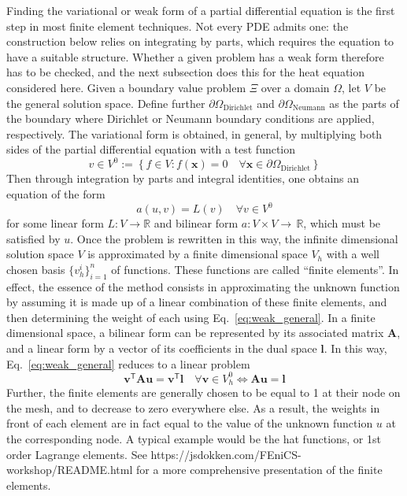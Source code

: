 \documentclass{article}
\newcommand{\assign}{:=}
\newcommand{\tmmathbf}[1]{\ensuremath{\boldsymbol{#1}}}
\newcommand{\tmop}[1]{\ensuremath{\operatorname{#1}}}
\begin{document}
Finding the variational or weak form of a partial differential equation is the
first step in most finite element techniques. Not every PDE admits one: the
construction below relies on integrating by parts, which requires the equation
to have a suitable structure. Whether a given problem has a weak
form therefore has to be checked, and the next subsection does this for the
heat equation considered here. Given a boundary value problem
$\Xi$ over a domain $\Omega$, let $V$ be the general solution space. Define
further $\partial \Omega_{\tmop{Dirichlet}}$ and $\partial
\Omega_{\tmop{Neumann}}$ as the parts of the boundary where Dirichlet or
Neumann boundary conditions are applied, respectively. The variational form is
obtained, in general, by multiplying both sides of the partial differential
equation with a test function
\[ v \in V^0 \assign \left\{ f \in V : f (\mathbf{x}) = 0 \quad \forall
   \mathbf{x} \in \partial \Omega_{\tmop{Dirichlet}}  \right\} \]
Then through integration by parts and integral identities, one obtains an
equation of the form
\begin{equation}
  \label{eq:weak_general}
  a (u, v) = L (v) \quad \forall v \in V^0
\end{equation}
for some linear form $L : V \rightarrow \mathbb{R}$ and bilinear form $a : V
\times V \rightarrow \, \mathbb{R}$, which must be satisfied by $u$. Once the problem is rewritten in this
way, the infinite dimensional solution space $V$ is approximated by a finite
dimensional space $V_h$ with a well chosen basis $\{ v^i_h \}_{i = 1}^n$ of
functions. These functions are called ``finite elements''. In effect, the
essence of the method consists in approximating the unknown function by
assuming it is made up of a linear combination of these finite elements, and
then determining the weight of each using Eq.~\eqref{eq:weak_general}. In a
finite dimensional space, a bilinear form can be represented by its associated
matrix $\mathbf{A}$, and a linear form by a vector of its coefficients in the
dual space $\tmmathbf{l}$. In this way, Eq.~\eqref{eq:weak_general} reduces to
a linear problem
\[ \mathbf{v}^\mathsf{T}\mathbf{A}\mathbf{u}=\mathbf{v}^\mathsf{T}\tmmathbf{l}\quad \forall\mathbf{v}\in V^0_h \iff \mathbf{A}\mathbf{u}=\tmmathbf{l} \]
Further, the finite elements are generally chosen to be equal to 1 at their
node on the mesh, and to decrease to zero everywhere else. As a result, the
weights in front of each element are in fact equal to the value of the unknown
function $u$ at the corresponding node. A typical example would be the hat
functions, or 1st order Lagrange elements. See
https://jsdokken.com/FEniCS-workshop/README.html for a more comprehensive
presentation of the finite elements.
\end{document}
